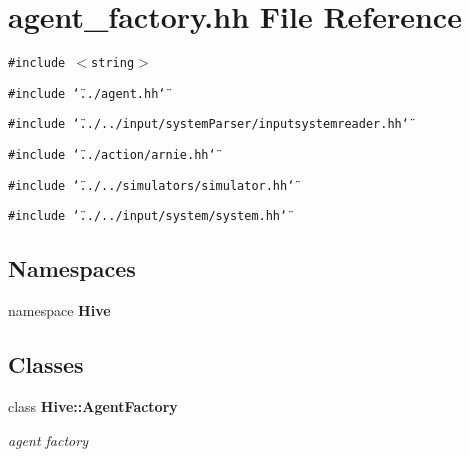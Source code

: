 \section{agent\_\-factory.hh File Reference}
\label{agent__factory_8hh}


{\tt \#include $<$string$>$}\par
{\tt \#include \char`\"{}../agent.hh\char`\"{}}\par
{\tt \#include \char`\"{}../../input/systemParser/inputsystemreader.hh\char`\"{}}\par
{\tt \#include \char`\"{}../action/arnie.hh\char`\"{}}\par
{\tt \#include \char`\"{}../../simulators/simulator.hh\char`\"{}}\par
{\tt \#include \char`\"{}../../input/system/system.hh\char`\"{}}\par
\subsection*{Namespaces}
\begin{CompactItemize}
\item 
namespace {\bf Hive}
\end{CompactItemize}
\subsection*{Classes}
\begin{CompactItemize}
\item 
class {\bf Hive::AgentFactory}
\begin{CompactList}\small\item\em agent factory \item\end{CompactList}\end{CompactItemize}
